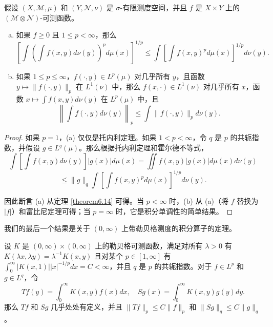 \documentclass[lang=cn,10pt,thmcnt=section]{elegantbook}
\begin{document}
\begin{theorem}[积分的闵可夫斯基不等式]\label{theorem6.19}
假设 $(X, \mathcal{M}, \mu)$ 和 $(Y, \mathcal{N}, \nu)$ 是 $\sigma$-有限测度空间，并且 $f$ 是 $X \times Y$ 上的 $(\mathcal{M} \otimes \mathcal{N})$-可测函数。
\begin{enumerate}[(a)]
\item 如果 $f \geq 0$ 且 $1 \leq p < \infty$，那么
\[ \left[ \int \left( \int f(x,y) d\nu(y) \right)^p d\mu(x) \right]^{1/p} \leq \int \left[ \int f(x,y)^p d\mu(x) \right]^{1/p} d\nu(y). \]

\item 如果 $1 \leq p \leq \infty$，$f(\cdot,y) \in L^p(\mu)$ 对几乎所有 $y$，且函数 $y \mapsto \|f(\cdot,y)\|_p$ 在 $L^1(\nu)$ 中，那么 $f(x,\cdot) \in L^1(\nu)$ 对几乎所有 $x$，函数 $x \mapsto \int f(x,y) d\nu(y)$ 在 $L^p(\mu)$ 中，且
\[ \left\| \int f(\cdot,y) d\nu(y) \right\|_p \leq \int \|f(\cdot,y)\|_p d\nu(y). \]
\end{enumerate}
\end{theorem}

\begin{proof}
如果 $p = 1$，(a) 仅仅是托内利定理。如果 $1 < p < \infty$，令 $q$ 是 $p$ 的共轭指数，并假设 $g \in L^q(\mu)$。那么根据托内利定理和霍尔德不等式，
\[ \int \left[ \int f(x,y) d\nu(y) \right] |g(x)| d\mu(x) = \iint f(x,y)|g(x)| d\mu(x) d\nu(y) \]
\[ \leq \|g\|_q \int \left[ \int f(x,y)^p d\mu(x) \right]^{1/p} d\nu(y). \]

因此断言 (a) 从定理 \ref{theorem6.14} 可得。当 $p < \infty$ 时，(b) 从 (a)（将 $f$ 替换为 $|f|$）和富比尼定理可得；当 $p = \infty$ 时，它是积分单调性的简单结果。
\end{proof}

我们的最后一个结果是关于 $(0, \infty)$ 上带勒贝格测度的积分算子的定理。

\begin{theorem}\label{theorem6.20}
设 $K$ 是 $(0,\infty) \times (0,\infty)$ 上的勒贝格可测函数，满足对所有 $\lambda > 0$ 有 $K(\lambda x, \lambda y) = \lambda^{-1}K(x,y)$ 且对某个 $p \in [1,\infty]$ 有 $\int_0^\infty |K(x,1)||x|^{-1/p} dx = C < \infty$，并且 $q$ 是 $p$ 的共轭指数。对于 $f \in L^p$ 和 $g \in L^q$，令
\[ Tf(y) = \int_0^\infty K(x,y)f(x) dx, \quad Sg(x) = \int_0^\infty K(x,y)g(y) dy. \]
那么 $Tf$ 和 $Sg$ 几乎处处有定义，并且 $\|Tf\|_p \leq C\|f\|_p$ 和 $\|Sg\|_q \leq C\|g\|_q$。
\end{theorem}
\end{document}
